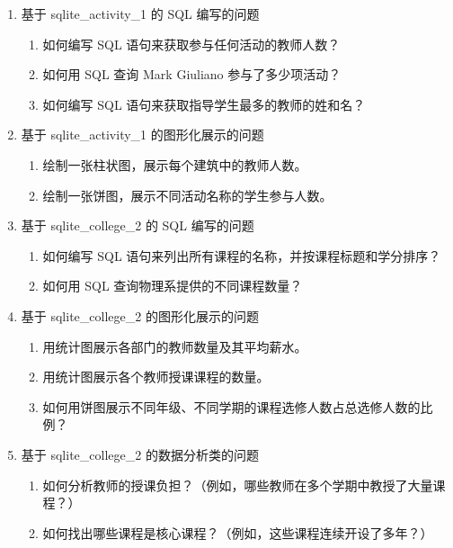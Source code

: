 \documentclass{article}
\begin{document}
	\begin{enumerate}[noitemsep, label={\arabic*.}]
		\item 基于 sqlite\_activity\_1 的 SQL 编写的问题
		\begin{enumerate}[noitemsep, label={\alph*.}]
			\item 如何编写 SQL 语句来获取参与任何活动的教师人数？
			\item 如何用 SQL 查询 Mark Giuliano 参与了多少项活动？
			\item 如何编写 SQL 语句来获取指导学生最多的教师的姓和名？
		\end{enumerate}
		
		\item 基于 sqlite\_activity\_1 的图形化展示的问题
		\begin{enumerate}[noitemsep, label={\alph*.}]
			\item 绘制一张柱状图，展示每个建筑中的教师人数。
			\item 绘制一张饼图，展示不同活动名称的学生参与人数。
		\end{enumerate}
		
		\item 基于 sqlite\_college\_2 的 SQL 编写的问题
		\begin{enumerate}[noitemsep, label={\alph*.}]
			\item 如何编写 SQL 语句来列出所有课程的名称，并按课程标题和学分排序？
			\item 如何用 SQL 查询物理系提供的不同课程数量？
		\end{enumerate}
		
		\item 基于 sqlite\_college\_2 的图形化展示的问题
		\begin{enumerate}[noitemsep, label={\alph*.}]
			\item 用统计图展示各部门的教师数量及其平均薪水。
			\item 用统计图展示各个教师授课课程的数量。
			\item 如何用饼图展示不同年级、不同学期的课程选修人数占总选修人数的比例？
		\end{enumerate}
		
		\item 基于 sqlite\_college\_2 的数据分析类的问题
		\begin{enumerate}[noitemsep, label={\alph*.}]
			\item 如何分析教师的授课负担？（例如，哪些教师在多个学期中教授了大量课程？）
			\item 如何找出哪些课程是核心课程？（例如，这些课程连续开设了多年？）
		\end{enumerate}
	\end{enumerate}
	
\end{document}
